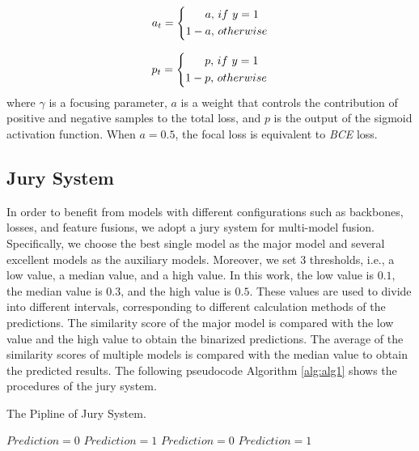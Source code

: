 \documentclass[a4paper, 10pt, conference]{ieeeconf}      %
\begin{document}
\begin{equation}
\setlength{\abovedisplayskip}{0.2cm}
\setlength{\belowdisplayskip}{0.2cm}
a_{t} = \left \{
\begin{aligned}
a ,&\ if\ y=1 \\
1 - a ,&\ otherwise
\end{aligned}
\right.
\end{equation}

\begin{equation}
\setlength{\abovedisplayskip}{0.2cm}
\setlength{\belowdisplayskip}{0.2cm}
p_{t} = \left \{
\begin{aligned}
p ,&\ if\ y=1 \\
1 - p ,&\ otherwise
\end{aligned}
\right.
\end{equation}
where $\gamma$ is a focusing parameter, $a$ is a weight that controls the contribution of positive and negative samples to the total loss, and $p$ is the output of the sigmoid activation function. When $a=0.5$, the focal loss is equivalent to \emph{BCE} loss. 

\subsection{Jury System}

In order to benefit from models with different configurations such as backbones, losses, and feature fusions, we adopt a jury system for multi-model fusion. Specifically, we choose the best single model as the major model and several excellent models as the auxiliary models. Moreover, we set 3 thresholds, i.e., a low value, a median value, and a high value. In this work, the low value is $0.1$, the median value is $0.3$, and the high value is $0.5$. These values are used to divide into different intervals, corresponding to different calculation methods of the predictions. The similarity score of the major model is compared with the low value and the high value to obtain the binarized predictions. The average of the similarity scores of multiple models is compared with the median value to obtain the predicted results. The following pseudocode Algorithm \ref{alg:alg1} shows the procedures of the jury system.


\begin{algorithm}[t]
 \caption{The Pipline of Jury System.}
\label{alg:alg1}
 \LinesNumbered 
 {
  $Prediction=0$\;
 }
 {
  $Prediction=1$\;
 }
 {
  $Prediction=0$\;
 }
 {
  $Prediction=1$\;
 }
\end{algorithm}
\end{document}

